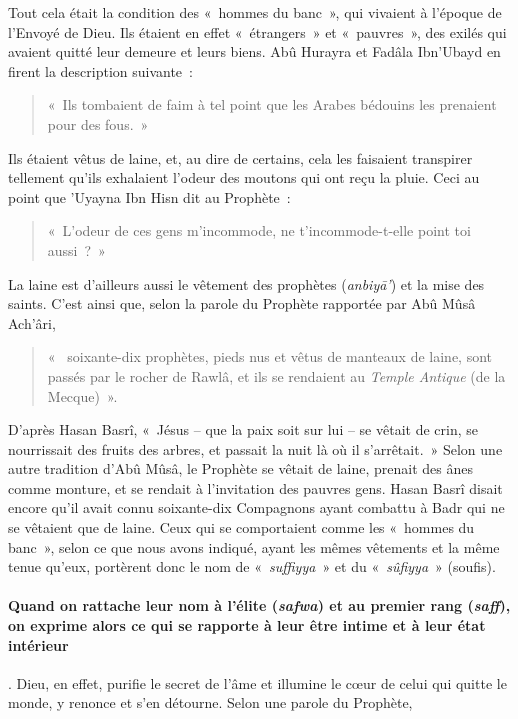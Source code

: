 Tout cela était la condition des «~hommes du banc~», qui vivaient à
l'époque de l'Envoyé de Dieu. Ils étaient en effet «~étrangers~» et
«~pauvres~», des exilés qui avaient quitté leur demeure et leurs biens.
Abû Hurayra et Fadâla Ibn'Ubayd en firent la description suivante~:

\begin{quote}
   «~Ils tombaient de faim à tel point que les Arabes bédouins les
prenaient pour des fous.~» 
\end{quote}
 Ils étaient vêtus de laine, et, au dire de
certains, cela les faisaient transpirer tellement qu'ils exhalaient
l'odeur des moutons qui ont reçu la pluie. Ceci au point que 'Uyayna Ibn
Hisn dit au Prophète~: 
\begin{quote}
   «~L'odeur de ces gens m'incommode, ne
t'incommode-t-elle point toi aussi~?~» 
\end{quote}


La laine est d'ailleurs aussi le vêtement des prophètes (\emph{anbiyā'})
et la mise des saints. C'est ainsi que, selon la parole du Prophète
rapportée par Abû Mûsâ Ach'âri,
\begin{quote}
    «~ soixante-dix prophètes, pieds nus et
vêtus de manteaux de laine, sont passés par le rocher de Rawlâ, et ils
se rendaient au \emph{Temple Antique} (de la Mecque)~».
\end{quote} 

D'après Hasan
Basrî, «~Jésus -- que la paix soit sur lui -- se vêtait de crin, se
nourrissait des fruits des arbres, et passait la nuit là où il
s'arrêtait.~» Selon une autre tradition d'Abû Mûsâ, le Prophète se
vêtait de laine, prenait des ânes comme monture, et se rendait à
l'invitation des pauvres gens. Hasan Basrî disait encore qu'il avait
connu soixante-dix Compagnons ayant combattu à Badr qui ne se vêtaient
que de laine. Ceux qui se comportaient comme les «~hommes du banc~»,
selon ce que nous avons indiqué, ayant les mêmes vêtements et la même
tenue qu'eux, portèrent donc le nom de «~\emph{suffiyya}~» et du
«~\emph{sûfiyya}~» (soufis).

\paragraph{Quand on rattache leur nom à l'élite (\emph{safwa}) et au premier rang
(\emph{saff}), on exprime alors ce qui se rapporte à leur être intime et
à leur état intérieur}. Dieu, en effet, purifie le secret de l'âme et
illumine le cœur de celui qui quitte le monde, y renonce et s'en
détourne. Selon une parole du Prophète,

